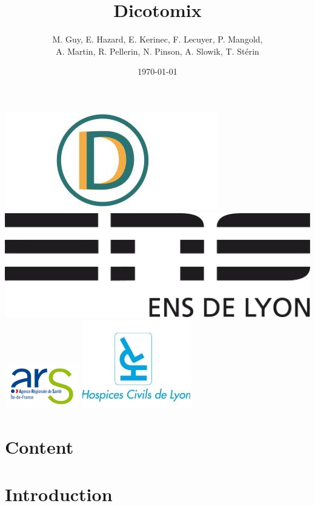 \documentclass[graphics]{beamer}
\title[Title]{Dicotomix}
\author[T.S]{M. Guy, E. Hazard, E. Kerinec, F. Lecuyer, P. Mangold,\\ A. Martin, R. Pellerin, N. Pinson, A. Slowik, T. Stérin}
\date{\today}
\begin{document}
\begin{frame}
	\titlepage
	\begin{center}
		\includegraphics[scale=0.2]{dicotomix}
		\includegraphics[scale=0.08]{logoens}
		\hspace{2em}
		\includegraphics[scale=0.55]{ars}
		\hspace{2em}
		\includegraphics[scale=0.3]{hospices_civils_de_lyon}
	\end{center}
\end{frame}

\section*{Content}
\begin{frame}
	\tableofcontents
\end{frame}

\section{Introduction}
\end{document}
